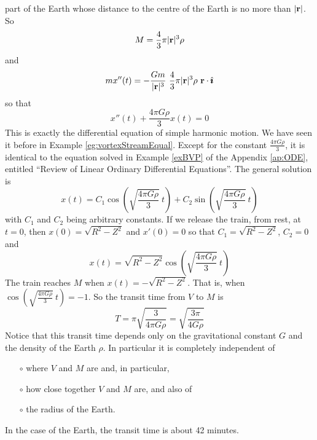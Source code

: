 \begin{eg}
{\begin{nfig}
\begin{center}
\end{center}
\end{nfig}
}
part of the Earth whose distance to the centre of the Earth is no more 
than $|\mathbf{r}|$. So
\begin{equation*}
M = \frac{4}{3}\pi |\mathbf{r}|^3\rho
\end{equation*}
and
\begin{equation*}
mx''(t) = -\frac{Gm}{|\mathbf{r}|^3}\  \frac{4}{3}\pi |\mathbf{r}|^3\rho\ \mathbf{r}\cdot\hat{\pmb{\imath}}
\end{equation*}
so that
\begin{equation*}
x''(t) + \frac{4\pi G\rho}{3} x(t) = 0
\end{equation*}
This is exactly the differential equation of simple harmonic motion.
We have seen it before in Example \ref{eg:vortexStreamEqual}.
Except for the constant $\frac{4\pi G\rho}{3}$, it is identical to the
equation solved in Example \ref{exBVP} of the Appendix \ref{ap:ODE}, entitled
``Review of Linear Ordinary Differential Equations''. 
The general solution is
\begin{equation*}
x(t)  = C_1 \cos\left(\sqrt{\frac{4\pi G\rho}{3}}\ t\right) 
             +  C_2 \sin\left(\sqrt{\frac{4\pi G\rho}{3}}\ t\right) 
\end{equation*}
with $C_1$ and $C_2$ being arbitrary constants. If we release the train, 
from rest, at $t=0$, then $x(0) = \sqrt{R^2-Z^2}$ and $x'(0)=0$
so that $C_1= \sqrt{R^2-Z^2}$, $C_2=0$ and
\begin{equation*}
x(t)  = \sqrt{R^2-Z^2} \cos\left(\sqrt{\frac{4\pi G\rho}{3}}\ t\right) 
\end{equation*}
The train reaches $M$ when $x(t)  = -\sqrt{R^2-Z^2}$. That is, when
$\cos\left(\sqrt{\frac{4\pi G\rho}{3}}\ t\right)=-1$. So the transit
time from $V$ to $M$ is
\begin{equation*}
T= \pi  \sqrt{\frac{3}{4\pi G\rho}}
  = \sqrt{\frac{3\pi}{4 G\rho}}
\end{equation*}
Notice that this transit time depends only on the gravitational constant
$G$ and the density of the Earth $\rho$. In particular it is 
completely independent of  
\begin{itemize}\itemsep1pt \parskip0pt  %
\item[$\circ$]
where $V$ and $M$ are and, in particular, 
\item[$\circ$]
how close together $V$ and $M$ are, and also of
\item[$\circ$]
the radius of the Earth.
\end{itemize}
In the case of the Earth, the transit time is about 42 minutes.


\end{eg}
